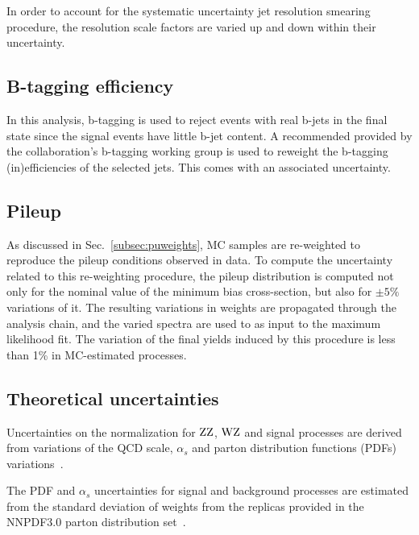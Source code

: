 In order to account for the systematic uncertainty jet resolution smearing procedure, the resolution scale factors are varied up and down within their uncertainty.

\subsection{B-tagging efficiency}

In this analysis, b-tagging is used to reject events with real b-jets in 
the final state since the signal events have little b-jet content. 
A recommended provided by the collaboration's b-tagging working group is used
to reweight the b-tagging (in)efficiencies of the selected jets.
This comes with an associated uncertainty.

\subsection{Pileup}

As discussed in Sec.~\ref{subsec:puweights}, MC samples are re-weighted to
reproduce the pileup conditions observed in data.
To compute the uncertainty related to this re-weighting procedure, the pileup distribution is 
computed not only for the nominal value of the minimum bias cross-section,
but also for $\pm5\%$ variations of it.
The resulting variations in weights are propagated through the analysis chain, 
and the varied \met spectra are used to as input to the maximum likelihood fit.
The variation of the final yields induced by this procedure is less than 1\% in MC-estimated processes.


\subsection{Theoretical uncertainties}
\label{subsec:dmtheo}

Uncertainties on the normalization for $\mathrm{Z}\mathrm{Z}$, $\mathrm{W}\mathrm{Z}$ and signal
processes are derived from variations of the QCD scale, $\alpha_{s}$
and parton distribution functions (PDFs)
variations~\cite{Botje:2011sn,Alekhin:2011sk,Lai:2010vv,Martin:2009iq,Ball:2011mu,MCFM}. 

The PDF and $\alpha_s$ uncertainties for signal and background processes are estimated 
from the standard deviation of weights from the replicas provided in the 
NNPDF3.0 parton distribution set~\cite{nnpdf}.

